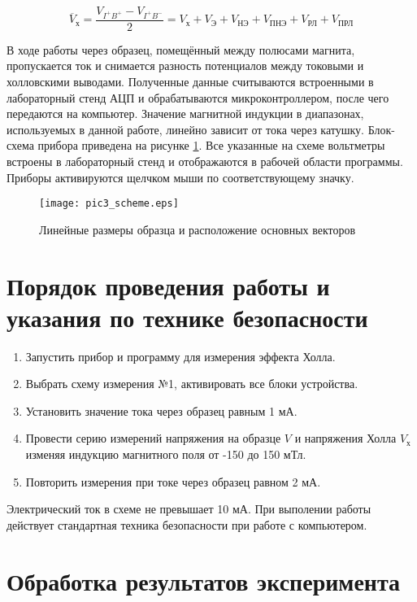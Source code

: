 \begin{equation}
\overline{V}_{\text{х}} = \frac{V_{I^{+}B^{+}} - V_{I^{+}B^{-}}}{2} = V_{\text{х}} + V_{\text{Э}} + V_{\text{НЭ}} + V_{\text{ПНЭ}} + V_{\text{РЛ}} + V_{\text{ПРЛ}}
\end{equation}

В ходе работы через образец, помещённый между полюсами магнита, пропускается ток и снимается разность потенциалов между токовыми и холловскими выводами. Полученные данные считываются встроенными в лабораторный стенд АЦП и обрабатываются микроконтроллером, после чего передаются на компьютер. Значение магнитной индукции в диапазонах, используемых в данной работе, линейно зависит от тока через катушку. Блок-схема прибора приведена на рисунке \ref{pic3_scheme}. Все указанные на схеме вольтметры встроены в лабораторный стенд и отображаются в рабочей области программы. Приборы активируются щелчком мыши по соответствующему значку.

\begin{figure}[h!]\centering
\texttt{[image: pic3\_scheme.eps]}
\caption{Линейные размеры образца и расположение основных векторов}
\label{pic3_scheme}
\end{figure}

\section{Порядок проведения работы и указания по технике безопасности}

\begin{enumerate}
\item Запустить прибор и программу для измерения эффекта Холла.
\item Выбрать схему измерения №1, активировать все блоки устройства.
\item Установить значение тока через образец равным 1 мА.
\item Провести серию измерений напряжения на образце $V$ и напряжения Холла $V_{\text{х}}$ изменяя индукцию магнитного поля от -150 до 150 мТл.
\item Повторить измерения при токе через образец равном 2 мА.
\end{enumerate}

Электрический ток в схеме не превышает 10 мА. При выполении работы действует стандартная техника безопасности при работе с компьютером.

\section{Обработка результатов эксперимента}

